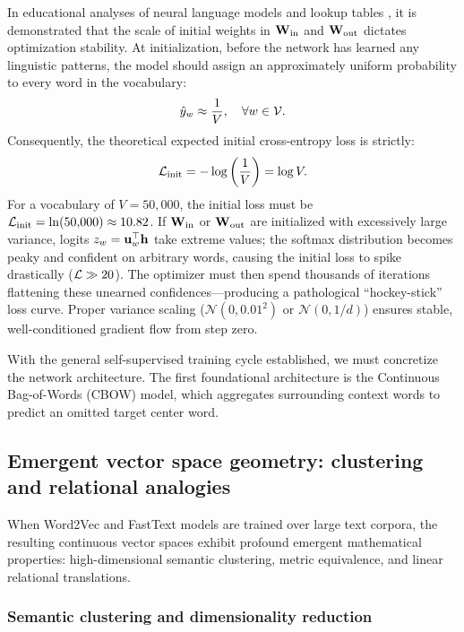 \documentclass[../../../main.tex]{subfiles}
\begin{document}
In educational analyses of neural language models and lookup tables \cite{karpathy2022makemore}, it is demonstrated that the scale of initial weights in $\mathbf{W}_{\text{in}}$ and $\mathbf{W}_{\text{out}}$ dictates optimization stability. At initialization, before the network has learned any linguistic patterns, the model should assign an approximately uniform probability to every word in the vocabulary:
\begin{equation}
\label{eq:uniform_prior}
\hat{y}_w \approx \frac{1}{V}, \quad \forall w \in \mathcal{V}.
\end{equation}
Consequently, the theoretical expected initial cross-entropy loss is strictly:
\begin{equation}
\label{eq:expected_initial_loss}
\mathcal{L}_{\text{init}} = -\log \left( \frac{1}{V} \right) = \log V.
\end{equation}
For a vocabulary of $V = 50{,}000$, the initial loss must be $\mathcal{L}_{\text{init}} = \ln(50{,}000) \approx 10.82$. If $\mathbf{W}_{\text{in}}$ or $\mathbf{W}_{\text{out}}$ are initialized with excessively large variance, logits $z_w = \mathbf{u}_w^\top \mathbf{h}$ take extreme values; the softmax distribution becomes peaky and confident on arbitrary words, causing the initial loss to spike drastically ($\mathcal{L} \gg 20$). The optimizer must then spend thousands of iterations flattening these unearned confidences---producing a pathological ``hockey-stick'' loss curve. Proper variance scaling ($\mathcal{N}(0, 0.01^2)$ or $\mathcal{N}(0, 1/d)$) ensures stable, well-conditioned gradient flow from step zero.

With the general self-supervised training cycle established, we must concretize the network architecture. The first foundational architecture is the Continuous Bag-of-Words (CBOW) model, which aggregates surrounding context words to predict an omitted target center word.

\clearpage


\subsection{Emergent vector space geometry: clustering and relational analogies}
\label{sec:vector_geometry_metrics}

When Word2Vec and FastText models are trained over large text corpora, the resulting continuous vector spaces exhibit profound emergent mathematical properties: high-dimensional semantic clustering, metric equivalence, and linear relational translations.

\subsubsection{Semantic clustering and dimensionality reduction}
\label{subsec:semantic_clustering_pca}
\end{document}
